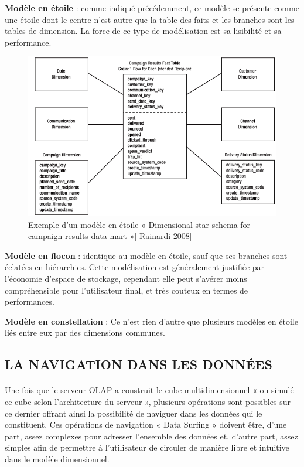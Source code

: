   \textbf{Modèle en étoile} : comme indiqué précédemment, ce modèle se présente comme une étoile dont le centre n’est autre que la table des faits et les branches sont les tables de dimension. La force de ce type de modélisation est sa lisibilité et sa performance. 
  
  \begin{figure}[h]
	\begin{center}
		\includegraphics[scale=0.85]{images/etoile.png}
		\caption{Exemple d'un modèle en étoile « Dimensional star schema for campaign results data mart »[ Rainardi 2008]}
		\label{model-en-etoile}
	\end{center}
\end{figure}
\textbf{Modèle en flocon} : identique au modèle en étoile, sauf que ses branches sont éclatées en hiérarchies. Cette modélisation est généralement justifiée par l'économie d'espace de stockage, cependant elle peut s’avérer moins compréhensible pour l'utilisateur final, et très couteux en termes de performances.

\textbf{Modèle en constellation} : Ce n'est rien d'autre que plusieurs modèles en étoile liés entre eux par des dimensions communes.

  
  \subsection{LA NAVIGATION DANS LES DONNÉES}
  
  \paragraph{}
  Une fois que le serveur OLAP a construit le cube multidimensionnel « ou simulé ce cube selon l’architecture du serveur », plusieurs opérations sont possibles sur ce dernier offrant ainsi la possibilité de naviguer dans les données qui le constituent. Ces opérations de navigation « Data Surfing » doivent être, d’une part, assez complexes pour adresser l’ensemble des données et, d’autre part, assez simples afin de permettre à l’utilisateur de circuler de manière libre et intuitive dans le modèle dimensionnel.\\
  
